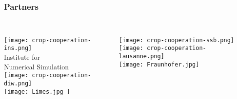 \begin{frame}\frametitle{Partners}\vspace{1.75cm}

\begin{columns}[t]

\centering \\  \vspace{-1.9cm}
	\texttt{[image: crop-cooperation-ins.png]} \\\vspace{-0.5cm}
	\footnotesize{Institute for \\ Numerical Simulation}\vspace{0.3cm}   \\ \vspace{0.5cm}
	\texttt{[image: crop-cooperation-diw.png]} \\ \vspace{0.95cm}
 	\texttt{[image: 
 	Limes.jpg
 	]}

	\centering \\ \vspace{-1.5cm}
	\texttt{[image: crop-cooperation-ssb.png]} \\ \vspace{0.85cm}
 	\texttt{[image: crop-cooperation-lausanne.png]} \\
 	\vspace{0.85cm}
 	\texttt{[image: 
 	Fraunhofer.jpg]}

\centering \\

\end{columns}

\end{frame}

